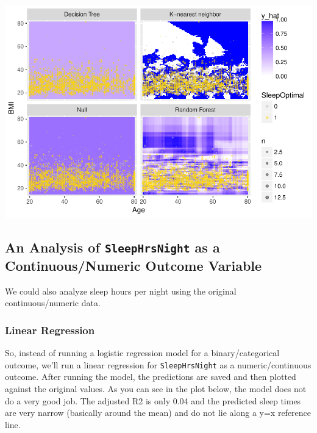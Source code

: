\documentclass[]{article}
\newenvironment{Shaded}{\begin{snugshade}}{\end{snugshade}}
\newcommand{\KeywordTok}[1]{\textcolor[rgb]{0.13,0.29,0.53}{\textbf{{#1}}}}
\newcommand{\StringTok}[1]{\textcolor[rgb]{0.31,0.60,0.02}{{#1}}}
\newcommand{\CommentTok}[1]{\textcolor[rgb]{0.56,0.35,0.01}{\textit{{#1}}}}
\newcommand{\NormalTok}[1]{{#1}}
\begin{document}
\includegraphics{Hmwk7AnswerKey_files/figure-latex/unnamed-chunk-22-1.pdf}

\subsection{\texorpdfstring{An Analysis of \texttt{SleepHrsNight} as a
Continuous/Numeric Outcome
Variable}{An Analysis of SleepHrsNight as a Continuous/Numeric Outcome Variable}}\label{an-analysis-of-sleephrsnight-as-a-continuousnumeric-outcome-variable}

We could also analyze sleep hours per night using the original
continuous/numeric data.

\subsubsection{Linear Regression}\label{linear-regression}

So, instead of running a logistic regression model for a
binary/categorical outcome, we'll run a linear regression for
\texttt{SleepHrsNight} as a numeric/continuous outcome. After running
the model, the predictions are saved and then plotted against the
original values. As you can see in the plot below, the model does not do
a very good job. The adjusted R2 is only 0.04 and the predicted sleep
times are very narrow (basically around the mean) and do not lie along a
y=x reference line.

\begin{Shaded}
\end{Shaded}
\end{document}
